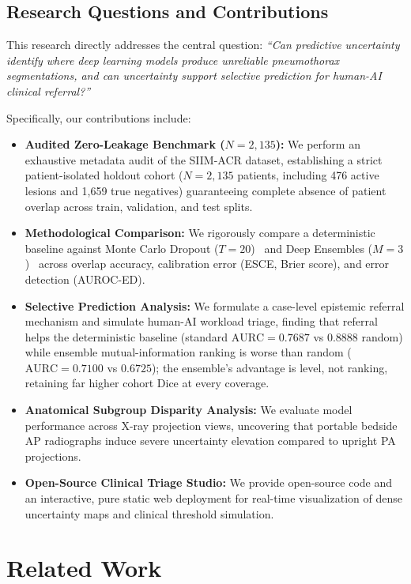 \documentclass[11pt,a4paper]{article}
\begin{document}
\subsection{Research Questions and Contributions}
This research directly addresses the central question: \textit{``Can predictive uncertainty identify where deep learning models produce unreliable pneumothorax segmentations, and can uncertainty support selective prediction for human-AI clinical referral?''}

Specifically, our contributions include:
\begin{itemize}
    \item \textbf{Audited Zero-Leakage Benchmark ($N=2,135$):} We perform an exhaustive metadata audit of the SIIM-ACR dataset, establishing a strict patient-isolated holdout cohort ($N=2,135$ patients, including 476 active lesions and 1,659 true negatives) guaranteeing complete absence of patient overlap across train, validation, and test splits.
    \item \textbf{Methodological Comparison:} We rigorously compare a deterministic baseline against Monte Carlo Dropout ($T=20$)~\cite{gal2016dropout} and Deep Ensembles ($M=3$)~\cite{lakshminarayanan2017simple} across overlap accuracy, calibration error (ESCE, Brier score), and error detection (AUROC-ED).
    \item \textbf{Selective Prediction Analysis:} We formulate a case-level epistemic referral mechanism and simulate human-AI workload triage, finding that referral helps the deterministic baseline (standard $\text{AURC} = 0.7687$ vs $0.8888$ random) while ensemble mutual-information ranking is worse than random ($\text{AURC} = 0.7100$ vs $0.6725$); the ensemble's advantage is level, not ranking, retaining far higher cohort Dice at every coverage.
    \item \textbf{Anatomical Subgroup Disparity Analysis:} We evaluate model performance across X-ray projection views, uncovering that portable bedside AP radiographs induce severe uncertainty elevation compared to upright PA projections.
    \item \textbf{Open-Source Clinical Triage Studio:} We provide open-source code and an interactive, pure static web deployment for real-time visualization of dense uncertainty maps and clinical threshold simulation.
\end{itemize}

\section{Related Work}
\label{sec:related_work}
\end{document}
